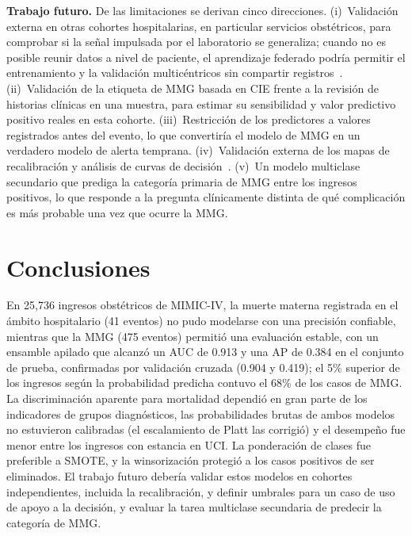 \documentclass[healthcare,article,submit,pdftex,moreauthors]{Definitions/mdpi_es}
\begin{document}
\textbf{Trabajo futuro.} De las limitaciones se derivan cinco direcciones. (i)~Validación externa
en otras cohortes hospitalarias, en particular servicios obstétricos, para comprobar si la
señal impulsada por el laboratorio se generaliza; cuando no es posible reunir datos a nivel de paciente, el aprendizaje federado podría permitir el
entrenamiento y la validación multicéntricos sin compartir registros~\cite{Rieke2020Federated,Dayan2021Federated}. (ii)~Validación de la etiqueta de MMG basada en CIE frente a
la revisión de historias clínicas en una muestra, para estimar su sensibilidad y valor predictivo positivo
reales en esta cohorte. (iii)~Restricción de los predictores a valores registrados antes del evento, lo que convertiría el
modelo de MMG en un verdadero modelo de alerta temprana. (iv)~Validación externa de los mapas de recalibración y
análisis de curvas de decisión~\cite{Vickers2006DCA}. (v)~Un modelo multiclase secundario que prediga la categoría primaria de MMG
entre los ingresos positivos, lo que responde a la pregunta clínicamente distinta de qué complicación
es más probable una vez que ocurre la MMG.

\section{Conclusiones}\label{sec:conclusions}
En 25{,}736 ingresos obstétricos de MIMIC-IV, la muerte materna registrada en el ámbito hospitalario
(41 eventos) no pudo modelarse con una precisión confiable, mientras que la MMG (475 eventos)
permitió una evaluación estable, con un ensamble apilado que alcanzó un AUC de
0.913 y una AP de 0.384 en el conjunto de prueba, confirmadas por validación cruzada (0.904 y 0.419); el 5\% superior de los ingresos
según la probabilidad predicha contuvo el 68\% de los casos de MMG. La discriminación aparente para mortalidad dependió en gran parte de los indicadores de grupos
diagnósticos, las probabilidades brutas de ambos modelos no estuvieron calibradas (el escalamiento de Platt las corrigió) y el desempeño fue menor entre los ingresos con estancia en UCI. La ponderación de clases
fue preferible a SMOTE, y la winsorización protegió a los casos positivos de ser eliminados. El trabajo futuro debería validar estos modelos
en cohortes independientes, incluida la recalibración, y definir umbrales para un caso de uso de apoyo a la decisión,
y evaluar la tarea multiclase secundaria de predecir la categoría de MMG.
\end{document}
